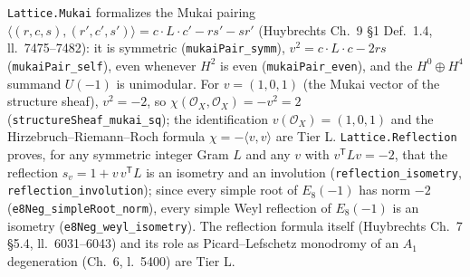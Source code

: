 \documentclass[11pt,a4paper]{article}
\theoremstyle{remark}
\begin{document}
\texttt{Lattice.Mukai} formalizes the Mukai pairing $\langle(r,c,s),(r',c',s')\rangle = c\cdot
L\cdot c' - rs'-sr'$ (Huybrechts Ch.~9 \S1 Def.~1.4, ll.~7475--7482): it is symmetric
(\texttt{mukaiPair\_\discretionary{}{}{}symm}), $v^2=c\cdot L\cdot c-2rs$
(\texttt{mukaiPair\_\discretionary{}{}{}self}), even whenever $H^2$ is even
(\texttt{mukaiPair\_\discretionary{}{}{}even}), and the $H^0\oplus H^4$ summand $U(-1)$ is unimodular.
For $v=(1,0,1)$ (the Mukai vector of the structure sheaf), $v^2=-2$, so
$\chi(\mathcal O_X,\mathcal O_X)=-v^2=2$ (\texttt{structureSheaf\_\discretionary{}{}{}mukai\_\discretionary{}{}{}sq});
the identification $v(\mathcal O_X)=(1,0,1)$ and the Hirzebruch--Riemann--Roch formula
$\chi=-\langle v,v\rangle$ are Tier L. \texttt{Lattice.Reflection} proves, for any symmetric integer
Gram $L$ and any $v$ with $v^{\mathsf T}Lv=-2$, that the reflection $s_v=1+v\,v^{\mathsf T}L$ is an
isometry and an involution (\texttt{reflection\_\discretionary{}{}{}isometry},
\texttt{reflection\_\discretionary{}{}{}involution}); since every simple root of $E_8(-1)$ has norm
$-2$ (\texttt{e8Neg\_\discretionary{}{}{}simpleRoot\_\discretionary{}{}{}norm}), every simple Weyl
reflection of $E_8(-1)$ is an isometry (\texttt{e8Neg\_\discretionary{}{}{}weyl\_\discretionary{}{}{}isometry}).
The reflection formula itself (Huybrechts Ch.~7 \S5.4, ll.~6031--6043) and its role as
Picard--Lefschetz monodromy of an $A_1$ degeneration (Ch.~6, l.~5400) are Tier L.
\end{document}
